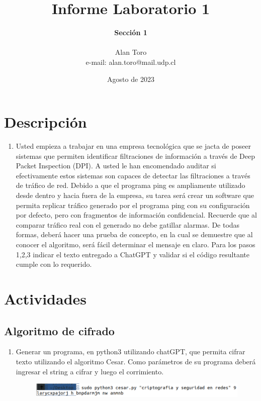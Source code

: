 \documentclass[letter,12pt]{article}
\begin{document}
%
   \title{\Huge{Informe Laboratorio 1}}
   \author{\textbf{Sección 1} \\  \\Alan Toro \\ e-mail: alan.toro@mail.udp.cl}
   \date{Agosto de 2023}
   \maketitle
   \tableofcontents
  \newpage
  

\section{Descripción}

\begin{enumerate}
    \item  Usted empieza a trabajar en una empresa tecnológica que se jacta de
      poseer sistemas que permiten identificar filtraciones de información a
      través de Deep Packet Inspection (DPI).  A usted le han encomendado
      auditar si efectivamente estos sistemas son capaces de detectar las
      filtraciones a través de tráfico de red. Debido a que el programa ping es
      ampliamente utilizado desde dentro y hacia fuera de la empresa, su tarea
      será crear un software que permita replicar tráfico generado por el
      programa ping con su configuración por defecto, pero con fragmentos de
      información confidencial. Recuerde que al comparar tráfico real con el
      generado no debe gatillar alarmas.  De todas formas, deberá hacer una
      prueba de concepto, en la cual se demuestre que al conocer el algoritmo,
      será fácil determinar el mensaje en claro.  Para los pasos 1,2,3 indicar
      el texto entregado a ChatGPT y validar si el código resultante cumple con
      lo requerido.
\end{enumerate}

\section{Actividades}
\subsection{Algoritmo de cifrado}

\begin{enumerate}
\item Generar un programa, en python3 utilizando chatGPT, que permita cifrar
texto utilizando el algoritmo Cesar. Como parámetros de su programa deberá
ingresar el string a cifrar y luego el corrimiento.
\begin{figure}[H]
        \centering
        \includegraphics[width=15cm]{actividades/A1.png}
        \label{fig:a1}
\end{figure}
\end{enumerate}
\end{document}
